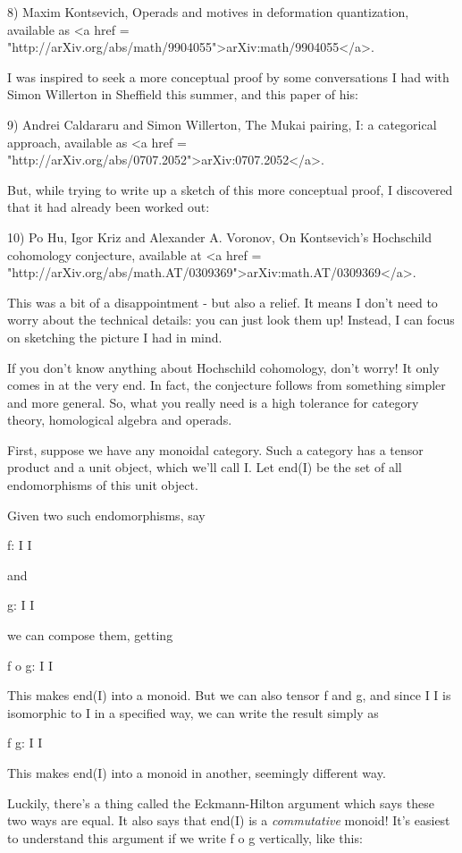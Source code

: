 8) Maxim Kontsevich, Operads and motives in deformation quantization,
available as <a href =
"http://arXiv.org/abs/math/9904055">arXiv:math/9904055</a>.

I was inspired to seek a more conceptual proof by some conversations 
I had with Simon Willerton in Sheffield this summer, and this paper 
of his:

9) Andrei Caldararu and Simon Willerton, The Mukai pairing, I: a
categorical approach, available as <a href =
"http://arXiv.org/abs/0707.2052">arXiv:0707.2052</a>.

But, while trying to write up a sketch of this more conceptual 
proof, I discovered that it had already been worked out:

10) Po Hu, Igor Kriz and Alexander A. Voronov, On Kontsevich's Hochschild
cohomology conjecture, available at <a href =
"http://arXiv.org/abs/math.AT/0309369">arXiv:math.AT/0309369</a>.

This was a bit of a disappointment - but also a relief.  It
means I don't need to worry about the technical details: you 
can just look them up!  Instead, I can focus on sketching the 
picture I had in mind.

If you don't know anything about Hochschild cohomology, don't worry!
It only comes in at the very end.  In fact, the conjecture
follows from something simpler and more general.  So, what you 
really need is a high tolerance for category theory, homological 
algebra and operads.

First, suppose we have any monoidal category.  Such a category
has a tensor product and a unit object, which we'll call I.  Let 
end(I) be the set of all endomorphisms of this unit object. 

Given two such endomorphisms, say 

f: I \to  I

and

g: I \to  I

we can compose them, getting

f o g: I \to  I

This makes end(I) into a monoid.  But we can also tensor f and
g, and since I \otimes  I is isomorphic to I in a specified way, 
we can write the result simply as

f \otimes  g: I \to  I

This makes end(I) into a monoid in another, seemingly different
way.  

Luckily, there's a thing called the Eckmann-Hilton argument which 
says these two ways are equal.  It also says that end(I) is a
\emph{commutative} monoid!  It's easiest to understand this argument 
if we write f o g vertically, like this:


